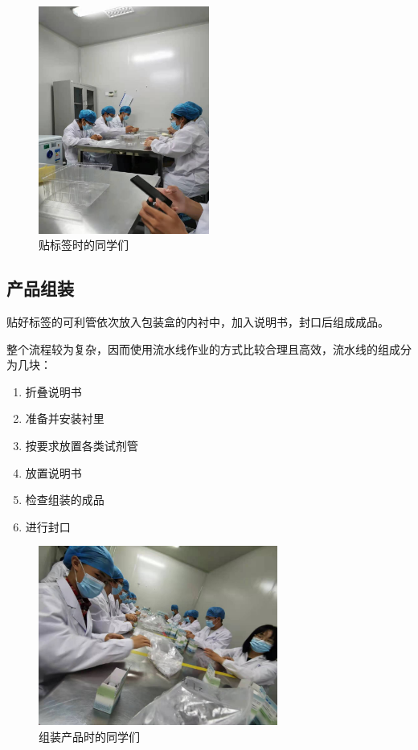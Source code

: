 \documentclass[cn,black,12pt,normal]{elegantnote}
\begin{document}
\begin{figure}[H]
    \centering
    \includegraphics[width=0.5\textwidth]{image/WechatIMG25.jpeg}
    \caption{贴标签时的同学们}
    \label{STAFF}
\end{figure}

\subsection{产品组装}

贴好标签的可利管依次放入包装盒的内衬中，加入说明书，封口后组成成品。

整个流程较为复杂，因而使用流水线作业的方式比较合理且高效，流水线的组成分为几块：
\begin{enumerate}
    \item 折叠说明书
    \item 准备并安装衬里
    \item 按要求放置各类试剂管
    \item 放置说明书
    \item 检查组装的成品
    \item 进行封口
\end{enumerate}

\begin{figure}[H]
    \centering
    \includegraphics[width=0.7\textwidth]{image/WechatIMG26.jpeg}
    \caption{组装产品时的同学们}
    \label{STAFF}
\end{figure}
\end{document}
